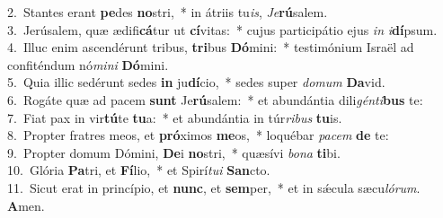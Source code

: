 {2.~}Stantes erant \textbf{pe}des \textbf{no}stri,~* in átriis tu\textit{is}, \textit{Je}\textbf{rú}salem.\\
{3.~}Jerúsalem, quæ ædifi\textbf{cá}tur ut \textbf{cí}vitas:~* cujus participátio ejus \textit{in} \textit{i}\textbf{dí}psum.\\
{4.~}Illuc enim ascendérunt tribus, \textbf{tri}bus \textbf{Dó}mini:~* testimónium Israël ad confiténdum nó\textit{mi}\textit{ni} \textbf{Dó}mini.\\
{5.~}Quia illic sedérunt sedes \textbf{in} ju\textbf{dí}cio,~* sedes super \textit{do}\textit{mum} \textbf{Da}vid.\\
{6.~}Rogáte quæ ad pacem \textbf{sunt} Je\textbf{rú}salem:~* et abundántia dili\textit{gén}\textit{ti}\textbf{bus} te:\\
{7.~}Fiat pax in vir\textbf{tú}te \textbf{tu}a:~* et abundántia in túr\textit{ri}\textit{bus} \textbf{tu}is.\\
{8.~}Propter fratres meos, et \textbf{pró}ximos \textbf{me}os,~* loquébar \textit{pa}\textit{cem} \textbf{de} te:\\
{9.~}Propter domum Dómini, \textbf{De}i \textbf{no}stri,~* quæsívi \textit{bo}\textit{na} \textbf{ti}bi.\\
{10.~}Glória \textbf{Pa}tri, et \textbf{Fí}lio,~* et Spirí\textit{tu}\textit{i} \textbf{San}cto.\\
{11.~}Sicut erat in princípio, et \textbf{nunc}, et \textbf{sem}per,~* et in sǽcula sæcu\textit{ló}\textit{rum}. \textbf{A}men.\\
